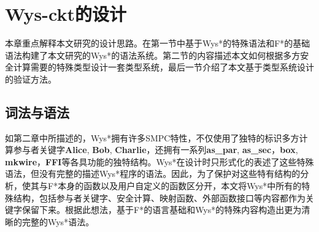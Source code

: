 \chapter{Wys-ckt的设计}\label{Design}
本章重点解释本文研究的设计思路。在第一节中基于Wys*的特殊语法和F*的基础语法构建了本文研究的Wys*的语法系统。第二节的内容描述本文如何根据多方安全计算需要的特殊类型设计一套类型系统，最后一节介绍了本文基于类型系统设计的验证方法。
\section{词法与语法}
如第二章中所描述的，Wys*拥有许多SMPC特性，不仅使用了独特的标识多方计算参与者关键字\textbf{Alice}, \textbf{Bob}, \textbf{Charlie}，还拥有一系列\textbf{as\_par}, \textbf{as\_sec}，\textbf{box}, \textbf{mkwire}，\textbf{FFI}等各具功能的独特结构。Wys*在设计时只形式化的表述了这些特殊语法，但没有完整的描述Wys*程序的语法。因此，为了保护对这些特有结构的分析，使其与F*本身的函数以及用户自定义的函数区分开，本文将Wys*中所有的特殊结构，包括参与者关键字、安全计算、映射函数、外部函数接口等内容都作为关键字保留下来。根据此想法，基于F*的语言基础和Wys*的特殊内容构造出更为清晰的完整的Wys*语法。

